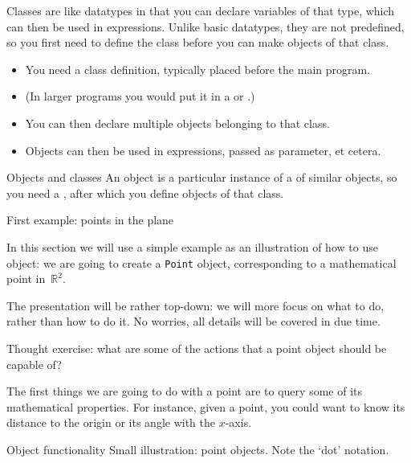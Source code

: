 Classes are like datatypes in that you can declare
variables of that type,
which can then be used in expressions.
Unlike basic datatypes, they are not predefined,
so you first need to define the class before
you can make objects of that class.

\begin{itemize}
\item You need a class definition, typically placed before the main
  program.
\item (In larger programs you would put it in a
   or .)
\item You can then declare multiple objects belonging to that
  class.
\item Objects can then be used in expressions, passed as parameter, et cetera.
\end{itemize}

\begin{slide}{Objects and classes}
  \label{label:class-def}
  An object is a particular instance of a  of
  similar objects, so you need a ,
  after which you define objects of that class.
\end{slide}

 {First example: points in the plane}

In this section we will use a simple example
as an illustration of how to use object:
we are going to create a
\lstinline{Point} object, corresponding to a mathematical point
in~$\mathbb{R}^2$.

The presentation will be rather top-down:
we will more focus on what to do,
rather than how to do it.
No worries, all details will be covered in due time.

\begin{exercise}
  \label{ex:point-what}
  Thought exercise:
  what are some of the actions that a point object
  should be capable of?
\end{exercise}

The first things we are going to do with a point are to
query some of its mathematical properties.
For instance,
given a point, you could want to know its distance to the origin
or its angle with the $x$-axis.

\begin{block}{Object functionality}
  \label{sl:object-functionality}
  Small illustration: point objects.
  Note the `dot' notation. 
\end{block}

